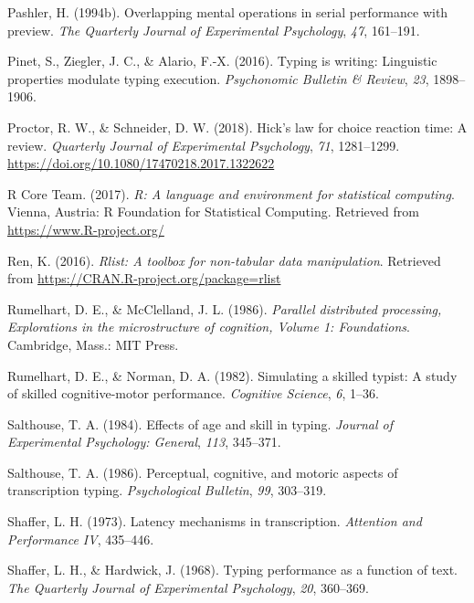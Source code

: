 \documentclass[,man,donotrepeattitle,floatsintext]{apa6}
\begin{document}
\leavevmode\hypertarget{ref-pashler_overlapping_1994}{}%
Pashler, H. (1994b). Overlapping mental operations in serial performance with preview. \emph{The Quarterly Journal of Experimental Psychology}, \emph{47}, 161--191.

\leavevmode\hypertarget{ref-PinetTypingwritingLinguistic2016}{}%
Pinet, S., Ziegler, J. C., \& Alario, F.-X. (2016). Typing is writing: Linguistic properties modulate typing execution. \emph{Psychonomic Bulletin \& Review}, \emph{23}, 1898--1906.

\leavevmode\hypertarget{ref-proctor_hicks_2018}{}%
Proctor, R. W., \& Schneider, D. W. (2018). Hick's law for choice reaction time: A review. \emph{Quarterly Journal of Experimental Psychology}, \emph{71}, 1281--1299. \url{https://doi.org/10.1080/17470218.2017.1322622}

\leavevmode\hypertarget{ref-R-base}{}%
R Core Team. (2017). \emph{R: A language and environment for statistical computing}. Vienna, Austria: R Foundation for Statistical Computing. Retrieved from \url{https://www.R-project.org/}

\leavevmode\hypertarget{ref-R-rlist}{}%
Ren, K. (2016). \emph{Rlist: A toolbox for non-tabular data manipulation}. Retrieved from \url{https://CRAN.R-project.org/package=rlist}

\leavevmode\hypertarget{ref-rumelhart_parallel_1986}{}%
Rumelhart, D. E., \& McClelland, J. L. (1986). \emph{Parallel distributed processing, Explorations in the microstructure of cognition, Volume 1: Foundations}. Cambridge, Mass.: MIT Press.

\leavevmode\hypertarget{ref-RumelhartSimulatingskilledtypist1982}{}%
Rumelhart, D. E., \& Norman, D. A. (1982). Simulating a skilled typist: A study of skilled cognitive-motor performance. \emph{Cognitive Science}, \emph{6}, 1--36.

\leavevmode\hypertarget{ref-salthouse_effects_1984}{}%
Salthouse, T. A. (1984). Effects of age and skill in typing. \emph{Journal of Experimental Psychology: General}, \emph{113}, 345--371.

\leavevmode\hypertarget{ref-salthouse_perceptual_1986}{}%
Salthouse, T. A. (1986). Perceptual, cognitive, and motoric aspects of transcription typing. \emph{Psychological Bulletin}, \emph{99}, 303--319.

\leavevmode\hypertarget{ref-shaffer_latency_1973}{}%
Shaffer, L. H. (1973). Latency mechanisms in transcription. \emph{Attention and Performance IV}, 435--446.

\leavevmode\hypertarget{ref-shaffer_typing_1968}{}%
Shaffer, L. H., \& Hardwick, J. (1968). Typing performance as a function of text. \emph{The Quarterly Journal of Experimental Psychology}, \emph{20}, 360--369.
\end{document}
